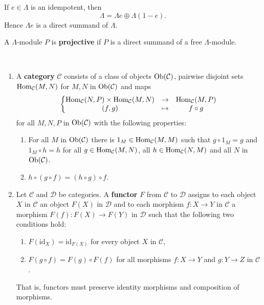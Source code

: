 
\begin{remark}
If $e\in\Lambda$ is an idempotent, then
\[
\Lambda=\Lambda e\oplus \Lambda(1-e).
\]
Hence $\Lambda e$ is a direct summand of $\Lambda$.
\end{remark}


\begin{definition}
A $\Lambda$-module $P$ is \textbf{projective} if $P$ is a direct summand of a free $\Lambda$-module.
\end{definition}


\begin{definition}\
\begin{enumerate}
\item A \textbf{category} $\mathcal C$ consists of a class of objects $\operatorname{Ob}(\mathcal C)$, pairwise disjoint sets $\operatorname{Hom}_{\mathcal C}(M,N)$ for $M,N$ in $\operatorname{Ob}(\mathcal C)$ and maps
\[
\left\{
\begin{matrix}
\operatorname{Hom}_{\mathcal C}(N,P) \times \operatorname{Hom}_{\mathcal C}(M,N) & \to & \operatorname{Hom}_{\mathcal C}(M,P) \\
(f,g) & \mapsto & f \circ g
\end{matrix}
\right.
\]
for all $M,N,P$ in $\operatorname{Ob}(\mathcal C)$ with the following properties:
\begin{enumerate}[label=(\alph*)]
\item For all $M$ in $\operatorname{Ob}(\mathcal C)$ there is $1_M\in \operatorname{Hom}_{\mathcal C}(M,M)$ such that $g\circ 1_M = g$ and $1_M\circ h = h$ for all $g\in \operatorname{Hom}_{\mathcal C}(M,N)$, all $h\in \operatorname{Hom}_{\mathcal C}(N,M)$ and all $N$ in $\operatorname{Ob}(\mathcal C)$.
\item $h\circ(g\circ f)=(h\circ g)\circ f$.
\end{enumerate}
\item Let $\mathcal C$ and $\mathcal D$ be categories. A \textbf{functor} $F$ from $\mathcal C$ to $\mathcal D$ assigns to each object $X$ in $\mathcal C$ an object $F ( X )$ in $\mathcal D$ and to each morphism $f:X\rightarrow Y$ in $\mathcal C$ a morphism $F ( f ) : F ( X ) \rightarrow F(Y)$ in $\mathcal D$ such that the following two conditions hold:
\begin{enumerate}[label=(\alph*)]
\item $F(\mathrm {id} _{X})=\mathrm {id} _{F(X)}$ for every object $X$ in $\mathcal C$,
\item $F(g\circ f)=F(g)\circ F(f)$ for all morphisms $f:X\rightarrow Y$ and $g:Y\rightarrow Z$ in $\mathcal C$.
\end{enumerate}

That is, functors must preserve identity morphisms and composition of morphisms.
\end{enumerate}
\end{definition}

